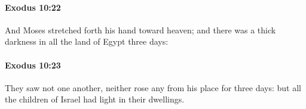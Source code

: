 		\paragraph{Exodus 10:22} %
			\label{EXODUS-10-22}

			And Moses stretched forth his hand toward heaven; and there was a thick darkness in all the land of Egypt three days:


		\paragraph{Exodus 10:23} %
			\label{EXODUS-10-23}

			They saw not one another, neither rose any from his place for three days: but all the children of Israel had light in their dwellings.


